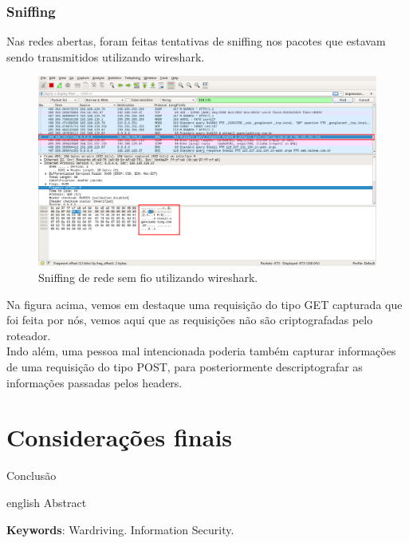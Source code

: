 \documentclass[
	article,			%
	12pt,				%
	oneside,			%
	a4paper,			%
	english,			%
	brazil,				%
	sumario=tradicional
	]{abntex2}
\begin{document}
\subsubsection{Sniffing}

Nas redes abertas, foram feitas tentativas de sniffing nos pacotes que estavam sendo transmitidos utilizando wireshark.

\begin{figure}[H]
	\centering
	\caption{Sniffing de rede sem fio utilizando wireshark.}
	\includegraphics[scale=0.32]{captura-wireshark-1}
\end{figure}

Na figura acima, vemos em destaque uma requisição do tipo GET capturada que foi feita por nós, vemos aqui que as requisições não são criptografadas pelo roteador.\\

Indo além, uma pessoa mal intencionada poderia também capturar informações de uma requisição do tipo POST, para posteriormente descriptografar as informações passadas pelos headers.\\


\section*{Considerações finais}

Conclusão

\postextual

\emptythanks
\maketitle

\renewcommand{\resumoname}{Abstract}
\begin{resumoumacoluna}
 \begin{otherlanguage*}{english}
   Abstract

   \vspace{\onelineskip}

   \noindent
   \textbf{Keywords}: Wardriving. Information Security.
 \end{otherlanguage*}
\end{resumoumacoluna}


\end{document}

